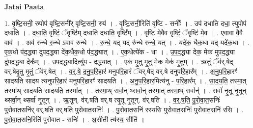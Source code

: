\documentclass[17pt]{extarticle}
\begin{document}
\textbf{Jatai Paata} \newline

1. वृ॒ष्टि॒सनी॒ रुपोप॑ वृष्टि॒सनी᳚र् वृष्टि॒सनी॒ रुप॑ । . वृ॒ष्टि॒सनी॒रिति॑ वृष्टि - सनीः᳚ । . उप॑ दधाति दधा॒ त्युपोप॑ दधाति । . द॒धा॒ति॒ वृष्टिं॒ ॅवृष्टि॑म् दधाति दधाति॒ वृष्टि᳚म् । . वृष्टि॑ मे॒वैव वृष्टिं॒ ॅवृष्टि॑ मे॒व । . ए॒वावा वै॒वै वाव॑ । . अव॑ रुन्धे रु॒न्धे ऽवाव॑ रुन्धे । . रु॒न्धे॒ यद् यद् रु॑न्धे रुन्धे॒ यत् । . यदे॑क॒ धैक॒धा यद् यदे॑क॒धा । . ए॒क॒धो प॑द॒द्ध्या दु॑पद॒द्ध्या दे॑क॒धैक॒धो प॑द॒द्ध्यात् । . ए॒क॒धेत्ये॑क - धा । . उ॒प॒द॒द्ध्या देक॒ मेक॑ मुपद॒द्ध्या दु॑पद॒द्ध्या देक᳚म् । . उ॒प॒द॒द्ध्यादित्यु॑प - द॒द्ध्यात् । . एक॑ मृ॒तु मृ॒तु मेक॒ मेक॑ मृ॒तुम् । . ऋ॒तुं ॅव॑र्.षेद् वर्.षेदृ॒तु मृ॒तुं ॅव॑र्.षेत् । . व॒र्॒.षे॒ द॒नु॒प॒रि॒हार॑ मनुपरि॒हारं॑ ॅवर्.षेद् वर्.षे दनुपरि॒हार᳚म् । . अ॒नु॒प॒रि॒हारꣳ॑ सादयति सादय त्यनुपरि॒हार॑ मनुपरि॒हारꣳ॑ सादयति । . अ॒नु॒प॒रि॒हार॒मित्य॑नु - प॒रि॒हार᳚म् । . सा॒द॒य॒ति॒ तस्मा॒त् तस्मा᳚थ् सादयति सादयति॒ तस्मा᳚त् । . तस्मा॒थ् सर्वा॒न् थ्सर्वा॒न् तस्मा॒त् तस्मा॒थ् सर्वान्॑ । . सर्वा॑ नृ॒तू नृ॒तून् थ्सर्वा॒न् थ्सर्वा॑ नृ॒तून् । . ऋ॒तून्. व॑र्.षति वर्.ष त्यृ॒तू नृ॒तून्. व॑र्.षति । . व॒र्॒.ष॒ति॒ पु॒रो॒वा॒त॒सनिः॑ पुरोवात॒सनि॑र् वर्.षति वर्.षति पुरोवात॒सनिः॑ । . पु॒रो॒वा॒त॒सनि॑ रस्यसि पुरोवात॒सनिः॑ पुरोवात॒सनि॑ रसि । . पु॒रो॒वा॒त॒सनि॒रिति॑ पुरोवात - सनिः॑ । . अ॒सीती त्य॑स्य॒ सीति॑ । \newline
\end{document}
